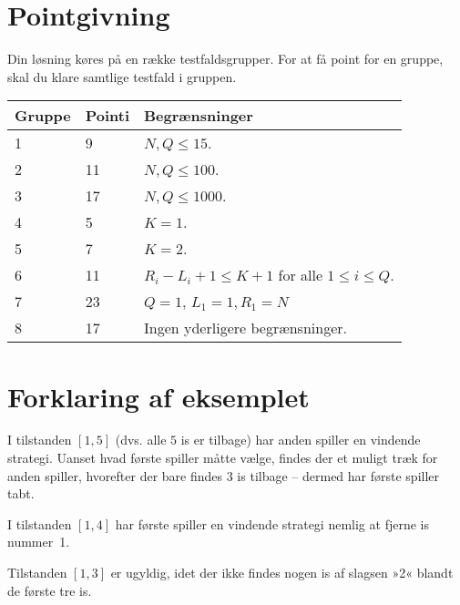 \section*{Pointgivning}

Din løsning køres på en række testfaldsgrupper.
For at få point for en gruppe, skal du klare samtlige testfald i gruppen.

\noindent
\begin{tabular}{| l | l | l |}
\hline
Gruppe & Pointi    & Begrænsninger \\ \hline
1     & 9          &  $N,Q \le 15$.\\ \hline
2     & 11         &  $N,Q \le 100$. \\ \hline
3     & 17         &  $N,Q \le 1000$. \\ \hline
4     & 5          &  $K=1$. \\ \hline
5     & 7          &  $K=2$. \\ \hline
6     & 11         &  $R_i - L_i + 1 \le K+1$ for alle $1 \le i \le Q$. \\ \hline
7     & 23         &  $Q=1$, $L_1=1, R_1=N$ \\ \hline
8     & 17         &  Ingen yderligere begrænsninger. \\ \hline
\end{tabular}

\section*{Forklaring af eksemplet}

I tilstanden $[1,5]$ (dvs. alle $5$ is er tilbage) har anden spiller en vindende strategi.
Uanset hvad første spiller måtte vælge, findes der et muligt træk for anden spiller, hvorefter der bare findes $3$ is tilbage -- dermed har  første spiller tabt.

I tilstanden $[1,4]$ har første spiller en vindende strategi nemlig at fjerne is nummer~1.

Tilstanden $[1,3]$ er ugyldig, idet der ikke findes nogen is af slagsen »2« blandt de første tre is.

